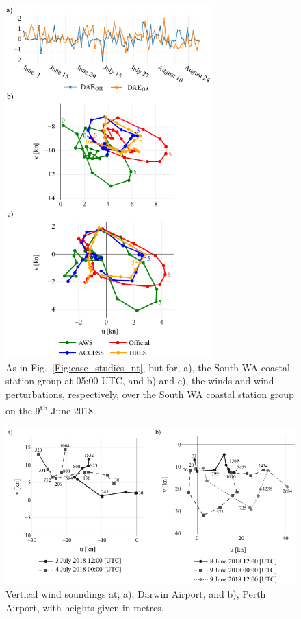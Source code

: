 \documentclass[twocol]{ametsoc}
\begin{document}
\begin{figure}
\centering
\includegraphics[width=19pc]{case_studies_wa.pdf}
\caption{As in Fig.~\ref{Fig:case_studies_nt}, but for, a), the South WA coastal station group at 05:00 UTC, and b) and c), the winds and wind perturbations, respectively, over the South WA coastal station group on the 9\textsuperscript{th} June 2018.} 
\label{Fig:case_studies_wa}
\end{figure}

\begin{figure}
\centering
\includegraphics[width=33pc]{perth_sounding.pdf}
\caption{Vertical wind soundings at, a), Darwin Airport, and b), Perth Airport, with heights given in metres.}
\label{Fig:perth_sounding}
\end{figure}
\end{document}
